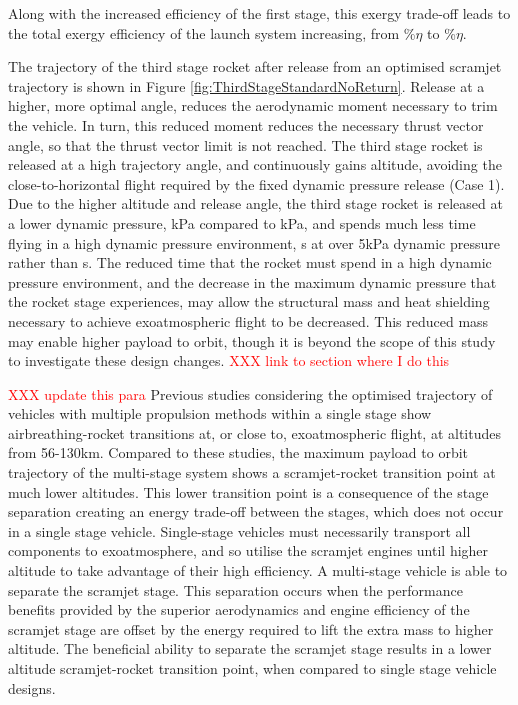 Along with the increased efficiency of the first stage, this exergy trade-off leads to the total exergy efficiency of the launch system increasing, from \totalExergyEffConstqNoReturn\%$\eta$ to \totalExergyEffStandardNoReturn\%$\eta$. 

The trajectory of the third stage rocket after release from an optimised scramjet trajectory is shown in Figure \ref{fig:ThirdStageStandardNoReturn}. Release at a higher, more optimal angle, reduces the aerodynamic moment necessary to trim the vehicle. In turn, this reduced moment reduces the necessary thrust vector angle, so that the thrust vector limit is not reached. The third stage rocket is released at a high trajectory angle, and continuously gains altitude, avoiding the close-to-horizontal flight required by the fixed dynamic pressure release (Case 1).
Due to the higher altitude and release angle, the third stage rocket is released at a lower dynamic pressure, \secondthirdSeparationqCdStandardNoReturn kPa compared to \secondthirdSeparationqConstqNoReturn kPa, and spends much less time flying in a high dynamic pressure environment, \thirdqOverFiveStandard s at over 5kPa dynamic pressure rather than \thirdqOverFiveConstqNoReturn s. 
The reduced time that the rocket must spend in a high dynamic pressure environment, and the decrease in the maximum dynamic pressure that the rocket stage experiences, may allow the structural mass and heat shielding necessary to achieve exoatmospheric flight to be decreased. This reduced mass may enable higher payload to orbit, though it is beyond the scope of this study to investigate these design changes. \textcolor{red}{XXX link to section where I do this}

\textcolor{red}{XXX update this para}
Previous studies considering the optimised trajectory of vehicles with multiple propulsion methods within a single stage show airbreathing-rocket transitions at, or close to, exoatmospheric flight, at altitudes from 56-130km\cite{Lu1993,Trefny1999,Bradford2000}. Compared to these studies, the maximum payload to orbit trajectory of the multi-stage system shows a scramjet-rocket transition point at much lower altitudes.
This lower transition point is a consequence of the stage separation creating an energy trade-off between the stages, which does not occur in a single stage vehicle. Single-stage vehicles must necessarily transport all components to exoatmosphere, and so utilise the scramjet engines until higher altitude to take advantage of their high efficiency. A multi-stage vehicle is able to separate the scramjet stage. 
This separation occurs when the performance benefits provided by the superior aerodynamics and engine efficiency of the scramjet stage are offset by the energy required to lift the extra mass to higher altitude. The beneficial ability
to separate the scramjet stage results in a lower altitude scramjet-rocket transition point, when compared to single
stage vehicle designs.



